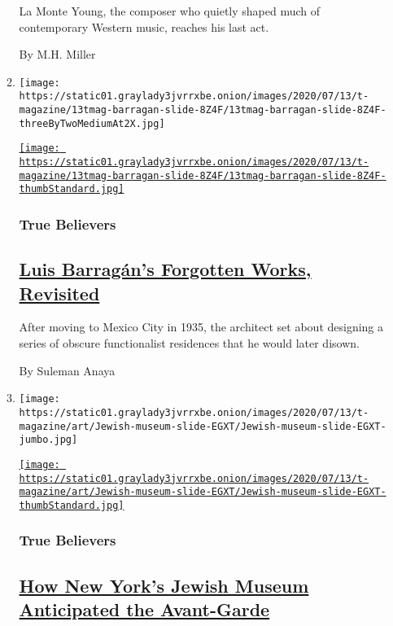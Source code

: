 \begin{enumerate}
\begin{enumerate}
    La Monte Young, the composer who quietly shaped much of contemporary
    Western music, reaches his last act.

    By M.H. Miller
  \item
    \texttt{[image: https://static01.graylady3jvrrxbe.onion/images/2020/07/13/t-magazine/13tmag-barragan-slide-8Z4F/13tmag-barragan-slide-8Z4F-threeByTwoMediumAt2X.jpg]}

    \href{/2020/07/24/t-magazine/luis-barragan.html}{\texttt{[image: https://static01.graylady3jvrrxbe.onion/images/2020/07/13/t-magazine/13tmag-barragan-slide-8Z4F/13tmag-barragan-slide-8Z4F-thumbStandard.jpg]}}

    \hypertarget{true-believers-2}{%
    \subsubsection{True Believers}\label{true-believers-2}}

    \hypertarget{luis-barraguxe1ns-forgotten-works-revisited}{%
    \subsection{\texorpdfstring{\href{/2020/07/24/t-magazine/luis-barragan.html}{Luis
    Barragán's Forgotten Works,
    Revisited}}{Luis Barragán's Forgotten Works, Revisited}}\label{luis-barraguxe1ns-forgotten-works-revisited}}

    After moving to Mexico City in 1935, the architect set about
    designing a series of obscure functionalist residences that he would
    later disown.

    By Suleman Anaya
  \item
    \texttt{[image: https://static01.graylady3jvrrxbe.onion/images/2020/07/13/t-magazine/art/Jewish-museum-slide-EGXT/Jewish-museum-slide-EGXT-jumbo.jpg]}

    \href{/2020/07/23/t-magazine/jewish-museum-new-york.html}{\texttt{[image: https://static01.graylady3jvrrxbe.onion/images/2020/07/13/t-magazine/art/Jewish-museum-slide-EGXT/Jewish-museum-slide-EGXT-thumbStandard.jpg]}}

    \hypertarget{true-believers-3}{%
    \subsubsection{True Believers}\label{true-believers-3}}

    \hypertarget{how-new-yorks-jewish-museum-anticipated-the-avant-garde}{%
    \subsection{\texorpdfstring{\href{/2020/07/23/t-magazine/jewish-museum-new-york.html}{How
    New York's Jewish Museum Anticipated the
    Avant-Garde}}{How New York's Jewish Museum Anticipated the Avant-Garde}}\label{how-new-yorks-jewish-museum-anticipated-the-avant-garde}}


\end{enumerate}
\end{enumerate}
